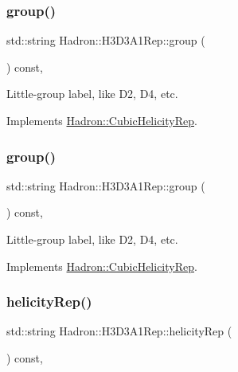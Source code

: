 \subsubsection{\texorpdfstring{group()}{group()}\hspace{0.1cm}{\footnotesize\ttfamily [2/3]}}
{\footnotesize\ttfamily std\+::string Hadron\+::\+H3\+D3\+A1\+Rep\+::group (\begin{DoxyParamCaption}{ }\end{DoxyParamCaption}) const\hspace{0.3cm}{\ttfamily [inline]}, {\ttfamily [virtual]}}

Little-\/group label, like D2, D4, etc. 

Implements \mbox{\hyperlink{structHadron_1_1CubicHelicityRep_a101a7d76cd8ccdad0f272db44b766113}{Hadron\+::\+Cubic\+Helicity\+Rep}}.

\mbox{\label{structHadron_1_1H3D3A1Rep_a4b4fc6752f25df5714c95532184a4f8e}} 
\subsubsection{\texorpdfstring{group()}{group()}\hspace{0.1cm}{\footnotesize\ttfamily [3/3]}}
{\footnotesize\ttfamily std\+::string Hadron\+::\+H3\+D3\+A1\+Rep\+::group (\begin{DoxyParamCaption}{ }\end{DoxyParamCaption}) const\hspace{0.3cm}{\ttfamily [inline]}, {\ttfamily [virtual]}}

Little-\/group label, like D2, D4, etc. 

Implements \mbox{\hyperlink{structHadron_1_1CubicHelicityRep_a101a7d76cd8ccdad0f272db44b766113}{Hadron\+::\+Cubic\+Helicity\+Rep}}.

\mbox{\label{structHadron_1_1H3D3A1Rep_a70ba9574e123f458fa29aae49a92f425}} 
\subsubsection{\texorpdfstring{helicityRep()}{helicityRep()}\hspace{0.1cm}{\footnotesize\ttfamily [1/2]}}
{\footnotesize\ttfamily std\+::string Hadron\+::\+H3\+D3\+A1\+Rep\+::helicity\+Rep (\begin{DoxyParamCaption}{ }\end{DoxyParamCaption}) const\hspace{0.3cm}{\ttfamily [inline]}, {\ttfamily [virtual]}}

